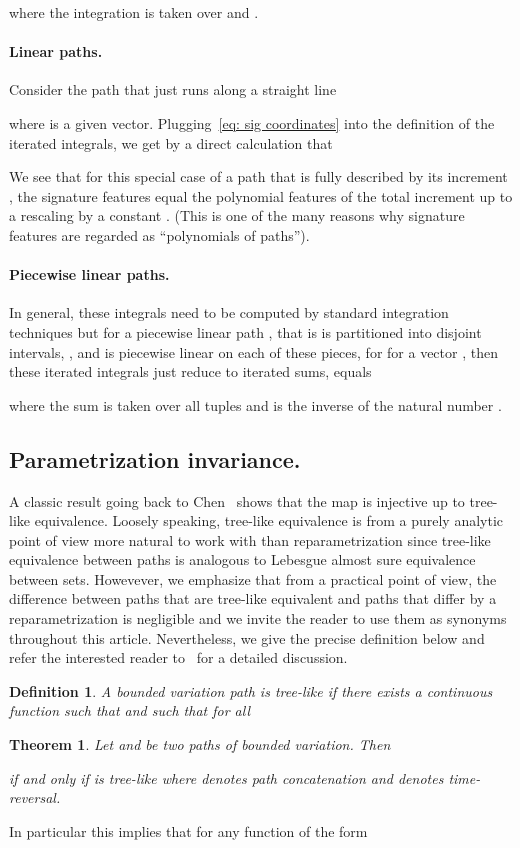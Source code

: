 \documentclass{article}
\newtheorem{theorem}{Theorem}
\newtheorem{definition}{Definition}
\begin{document}
where the integration is taken over  and .
\paragraph{Linear paths.}
Consider the path  that just runs along a straight line

where  is a given vector.
Plugging~\eqref{eq: sig coordinates} into the definition of the iterated integrals, we get by a direct calculation that 


We see that for this special case of a path  that is fully described by its increment , the signature features  equal the polynomial features  of the total increment  up to a rescaling by a constant . 
(This is one of the many reasons why signature features are regarded as ``polynomials of paths''). 

\paragraph{Piecewise linear paths.}
In general, these integrals need to be computed by standard integration techniques but for a piecewise linear path , that is  is partitioned into  disjoint intervals, , and  is piecewise linear on each of these pieces,  for  for a vector , then these iterated integrals just reduce to iterated sums,  equals 

where the sum is taken over all tuples  and  is the inverse of the natural number .  
	
\subsection{Parametrization invariance.}
A classic result going back to Chen~\cite{chen-58} shows that the map  is injective up to tree-like equivalence. 
Loosely speaking, tree-like equivalence is from a purely analytic point of view more natural to work with than reparametrization since tree-like equivalence between paths is analogous to Lebesgue almost sure equivalence between sets.
Howevever, we emphasize that from a practical point of view, the difference between paths that are tree-like equivalent and paths that differ by a reparametrization is negligible and we invite the reader to use them as synonyms throughout this article.
Nevertheless, we give the precise definition below and refer the interested reader to~\cite{MR2630037} for a detailed discussion. 
\begin{definition}
  A bounded variation path  is \emph{tree-like} if there exists a continuous function  such that  and such that for all 
  
\end{definition}
\begin{theorem}
  Let  and  be two paths of bounded variation.
  Then 

if and only if  is tree-like where  denotes path concatenation and  denotes time-reversal.
\end{theorem}
In particular this implies that for any function of the form 
\end{document}
